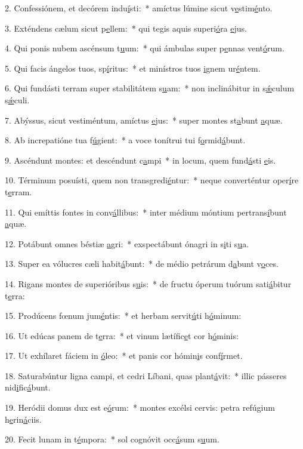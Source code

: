 2. Confessiónem, et decórem indu\uline{í}sti:~* amíctus lúmine sicut v\uline{e}stim\uline{é}nto.\par 
3. Exténdens cælum sicut p\uline{e}llem:~* qui tegis aquis superi\uline{ó}ra \uline{e}jus.\par 
4. Qui ponis nubem ascénsum t\uline{u}um:~* qui ámbulas super p\uline{e}nnas vent\uline{ó}rum.\par 
5. Qui facis ángelos tuos, sp\uline{í}ritus:~* et minístros tuos \uline{i}gnem ur\uline{é}ntem.\par 
6. Qui fundásti terram super stabilitátem s\uline{u}am:~* non inclinábitur in s\uline{ǽ}culum s\uline{ǽ}culi.\par 
7. Abýssus, sicut vestiméntum, amíctus \uline{e}jus:~* super montes st\uline{a}bunt \uline{a}quæ.\par 
8. Ab increpatióne tua f\uline{ú}gient:~* a voce tonítrui tui f\uline{o}rmid\uline{á}bunt.\par 
9. Ascéndunt montes: et descéndunt c\uline{a}mpi~* in locum, quem fund\uline{á}sti \uline{e}is.\par 
10. Términum posuísti, quem non transgredi\uline{é}ntur:~* neque converténtur oper\uline{í}re t\uline{e}rram.\par 
11. Qui emíttis fontes in conv\uline{á}llibus:~* inter médium móntium pertrans\uline{í}bunt \uline{a}quæ.\par 
12. Potábunt omnes béstiæ \uline{a}gri:~* exspectábunt ónagri in s\uline{i}ti s\uline{u}a.\par 
13. Super ea vólucres cæli habit\uline{á}bunt:~* de médio petrárum d\uline{a}bunt v\uline{o}ces.\par 
14. Rigans montes de superióribus s\uline{u}is:~* de fructu óperum tuórum sati\uline{á}bitur t\uline{e}rra:\par 
15. Prodúcens fœnum jum\uline{é}ntis:~* et herbam servit\uline{ú}ti h\uline{ó}minum:\par 
16. Ut edúcas panem de t\uline{e}rra:~* et vinum lætífic\uline{e}t cor h\uline{ó}minis:\par 
17. Ut exhílaret fáciem in \uline{ó}leo:~* et panis cor hómin\uline{i}s conf\uline{í}rmet.\par 
18. Saturabúntur ligna campi, et cedri Líbani, quas plant\uline{á}vit:~* illic pásseres nid\uline{i}fic\uline{á}bunt.\par 
19. Heródii domus dux est e\uline{ó}rum:~* montes excélsi cervis: petra refúgium h\uline{e}rin\uline{á}ciis.\par 
20. Fecit lunam in t\uline{é}mpora:~* sol cognóvit occ\uline{á}sum s\uline{u}um.\par 
